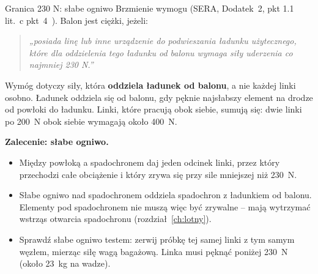 \begin{sekcja}{Granica 230 N: słabe ogniwo}\label{sec:slabe-ogniwo}
Brzmienie wymogu (SERA, Dodatek~2, pkt 1.1 lit.~c pkt~4~\cite{sera}). Balon jest ciężki, jeżeli:
\begin{quote}\itshape
„posiada linę lub inne urządzenie do podwieszania ładunku użytecznego, które dla oddzielenia tego ładunku od balonu wymaga siły uderzenia co najmniej 230 N.”
\end{quote}

Wymóg dotyczy siły, która \textbf{oddziela ładunek od balonu}, a nie każdej linki osobno. Ładunek oddziela się od balonu, gdy pęknie najsłabszy element na drodze od powłoki do ładunku. Linki, które pracują obok siebie, sumują się: dwie linki po \SI{200}{N} obok siebie wymagają około \SI{400}{N}.

\textbf{Zalecenie: słabe ogniwo.}
\begin{itemize}
  \item Między powłoką a spadochronem daj jeden odcinek linki, przez który przechodzi całe obciążenie i który zrywa się przy sile mniejszej niż \SI{230}{N}.
  \item Słabe ogniwo nad spadochronem oddziela spadochron z ładunkiem od balonu. Elementy pod spadochronem nie muszą więc być zrywalne -- mają wytrzymać wstrząs otwarcia spadochronu (rozdział~\ref{ch:lotny}).
  \item Sprawdź słabe ogniwo testem: zerwij próbkę tej samej linki z tym samym węzłem, mierząc siłę wagą bagażową. Linka musi pęknąć poniżej \SI{230}{N} (około \SI{23}{kg} na wadze).
\end{itemize}
\end{sekcja}

